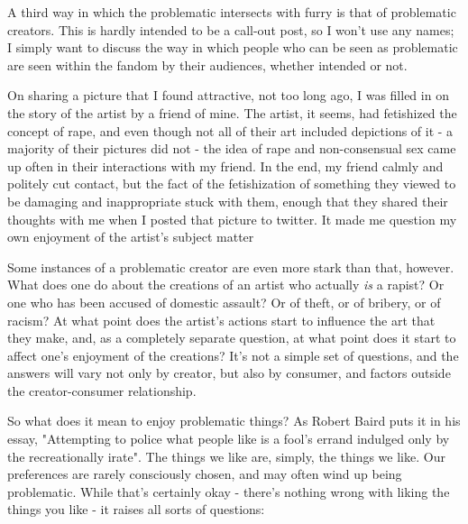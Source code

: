 A third way in which the problematic intersects with furry is that of problematic creators. This is hardly intended to be a call-out post, so I won't use any names; I simply want to discuss the way in which people who can be seen as problematic are seen within the fandom by their audiences, whether intended or not.

On sharing a picture that I found attractive, not too long ago, I was filled in on the story of the artist by a friend of mine. The artist, it seems, had fetishized the concept of rape, and even though not all of their art included depictions of it - a majority of their pictures did not - the idea of rape and non-consensual sex came up often in their interactions with my friend. In the end, my friend calmly and politely cut contact, but the fact of the fetishization of something they viewed to be damaging and inappropriate stuck with them, enough that they shared their thoughts with me when I posted that picture to twitter. It made me question my own enjoyment of the artist's subject matter

Some instances of a problematic creator are even more stark than that, however. What does one do about the creations of an artist who actually \emph{is} a rapist? Or one who has been accused of domestic assault? Or of theft, or of bribery, or of racism? At what point does the artist's actions start to influence the art that they make, and, as a completely separate question, at what point does it start to affect one's enjoyment of the creations? It's not a simple set of questions, and the answers will vary not only by creator, but also by consumer, and factors outside the creator-consumer relationship.

So what does it mean to enjoy problematic things? As Robert Baird puts it in his essay, "Attempting to police what people like is a fool's errand indulged only by the recreationally irate". The things we like are, simply, the things we like. Our preferences are rarely consciously chosen, and may often wind up being problematic. While that's certainly okay - there's nothing wrong with liking the things you like - it raises all sorts of questions:

